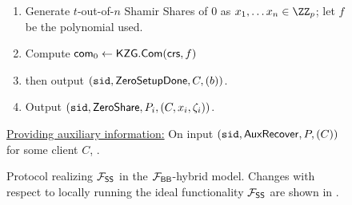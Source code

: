 \begin{figure*}
\begin{mdframed}
        \begin{enumerate}
            \item Generate $t$-out-of-$n$ Shamir Shares of $0$ as $x_1, \ldots x_n \in \ZZ_p$; let $f$ be the polynomial used.
            \item Compute $\mathsf{com}_0 \gets \mathsf{KZG}.\mathsf{Com}(\mathsf{crs}, f)$
            \item {} then output $(\texttt{sid}, \mathsf{ZeroSetupDone},\allowbreak C, (b))$. 
            \item {}
            Output $(\texttt{sid},\mathsf{ZeroShare}, P_i,\allowbreak (C, x_i, \zeta_i))$. %
        \end{enumerate}
    \underline{Providing auxiliary information:}
    On input $(\texttt{sid}, \mathsf{AuxRecover}, P, (C))$ for some client $C$, . %
        \end{mdframed}
        \caption{Protocol realizing $\mathcal{F}_\mathsf{SS}$ in the $\mathcal{F}_\mathsf{BB}$-hybrid model. Changes with respect to locally running the ideal functionality $\mathcal{F}_\mathsf{SS}$ are shown in .}
        \label{fig:fs_protocol}
    \end{figure*}